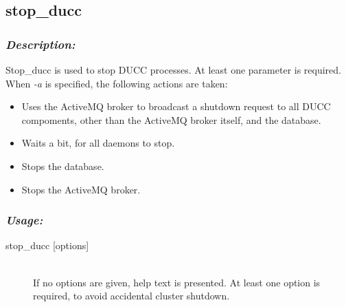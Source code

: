 \subsection{stop\_ducc}
\label{subsec:admin.stop-ducc}

    \subsubsection{{\em Description:}}
    Stop\_ducc is used to stop DUCC processes. At least one parameter is required.
    When {\em -a} is specified, the following actions are taken:
    \begin{itemize}
       \item Uses the ActiveMQ broker to broadcast a shutdown request to all
        DUCC compoments, other than the ActiveMQ broker itself, and the database.
      \item Waits a bit, for all daemons to stop.
      \item Stops the database.
      \item Stops the ActiveMQ broker.
    \end{itemize}


    \subsubsection{\em Usage:}

    \begin{description}
      \item[stop\_ducc {[options]}] \hfill \\ 
        If no options are given, help text is presented. At least one option is required, to avoid 
        accidental cluster shutdown. 
      \end{description}
    

